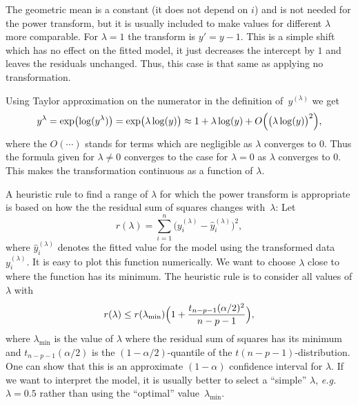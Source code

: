 \documentclass[
  a4paper,
]{article}
\theoremstyle{definition}
\theoremstyle{definition}
\theoremstyle{definition}
\theoremstyle{definition}
\theoremstyle{remark}
\begin{document}
The geometric mean is a constant (it does not depend on \(i\)) and is not needed
for the power transform, but it is usually included to make values for
different \(\lambda\) more comparable. For \(\lambda = 1\) the transform is \(y' = y
- 1\). This is a simple shift which has no effect on the fitted model, it just
decreases the intercept by \(1\) and leaves the residuals unchanged. Thus, this
case is that same as applying no transformation.

Using Taylor approximation on the numerator in the definition
of~\(y^{(\lambda)}\) we get
\begin{equation*}
  y^\lambda
  = \exp\bigl( \log(y^\lambda) \bigr)
  = \exp\bigl( \lambda \log(y) \bigr)
  \approx 1 + \lambda\log(y) + O\Bigl(\bigl(\lambda\log(y)\bigr)^2\Bigr),
\end{equation*}
where the \(O(\cdots)\) stands for terms which are negligible as
\(\lambda\) converges to \(0\). Thus the formula given for \(\lambda \neq 0\)
converges to the case for \(\lambda = 0\) as \(\lambda\) converges to \(0\).
This makes the transformation continuous as a function of \(\lambda\).

A heuristic rule to find a range of \(\lambda\) for which the power
transform is appropriate is based on how the the residual sum of
squares changes with~\(\lambda\): Let
\begin{equation*}
  r(\lambda)
  = \sum_{i=1}^n \bigl( y^{(\lambda)}_i - \hat y^{(\lambda)}_i \bigr)^2,
\end{equation*}
where \(\hat y^{(\lambda)}_i\) denotes the fitted value for the model
using the transformed data \(y^{(\lambda)}_i\). It is easy to plot
this function numerically. We want to choose \(\lambda\) close to
where the function has its minimum. The heuristic rule is to consider
all values of \(\lambda\) with
\begin{equation}
  r(\lambda)
  \leq r(\lambda_\mathrm{min}) \Bigl( 1 + \frac{t_{n-p-1}(\alpha/2)^2}{n-p-1} \Bigr),
      \label{eq:power-cutoff}
\end{equation}
where \(\lambda_\mathrm{min}\) is the value of \(\lambda\) where the residual
sum of squares has its minimum and \(t_{n-p-1}(\alpha/2)\) is the
\((1-\alpha/2)\)-quantile of the \(t(n-p-1)\)-distribution. One can show that this
is an approximate \((1-\alpha)\) confidence interval for \(\lambda\). If we want to
interpret the model, it is usually better to select a ``simple'' \(\lambda\),
\emph{e.g.}~\(\lambda=0.5\) rather than using the
``optimal'' value~\(\lambda_\mathrm{min}\).
\end{document}
